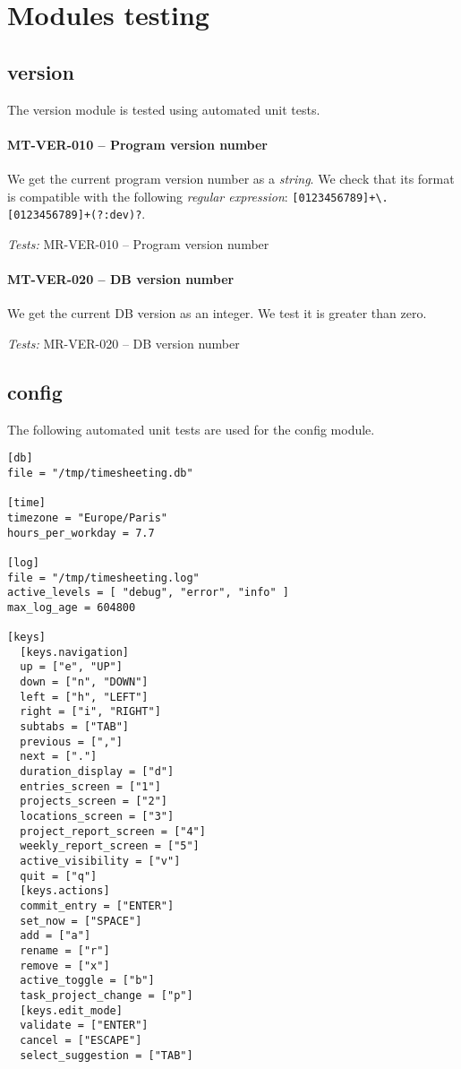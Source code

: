 \section{Modules testing}
\subsection{version}
The version module is tested using automated unit tests.

\paragraph{MT-VER-010 -- Program version number}
We get the current program version number as a \emph{string}.
We check that its format is compatible with the following \emph{regular
  expression}: \lstinline{[0123456789]+\.[0123456789]+(?:dev)?}.

\textit{Tests: } MR-VER-010 -- Program version number

\paragraph{MT-VER-020 -- DB version number}
We get the current DB version as an integer. We test it is greater than zero.

\textit{Tests: } MR-VER-020 -- DB version number

\subsection{config}
The following automated unit tests are used for the config module.

\begin{minipage}{\linewidth}
  \begin{lstlisting}[caption={timesheeting nominal configuration file},
                     label={lst:config_file}]
[db]
file = "/tmp/timesheeting.db"

[time]
timezone = "Europe/Paris"
hours_per_workday = 7.7

[log]
file = "/tmp/timesheeting.log"
active_levels = [ "debug", "error", "info" ]
max_log_age = 604800

[keys]
  [keys.navigation]
  up = ["e", "UP"]
  down = ["n", "DOWN"]
  left = ["h", "LEFT"]
  right = ["i", "RIGHT"]
  subtabs = ["TAB"]
  previous = [","]
  next = ["."]
  duration_display = ["d"]
  entries_screen = ["1"]
  projects_screen = ["2"]
  locations_screen = ["3"]
  project_report_screen = ["4"]
  weekly_report_screen = ["5"]
  active_visibility = ["v"]
  quit = ["q"]
  [keys.actions]
  commit_entry = ["ENTER"]
  set_now = ["SPACE"]
  add = ["a"]
  rename = ["r"]
  remove = ["x"]
  active_toggle = ["b"]
  task_project_change = ["p"]
  [keys.edit_mode]
  validate = ["ENTER"]
  cancel = ["ESCAPE"]
  select_suggestion = ["TAB"]
\end{lstlisting} \end{minipage}

